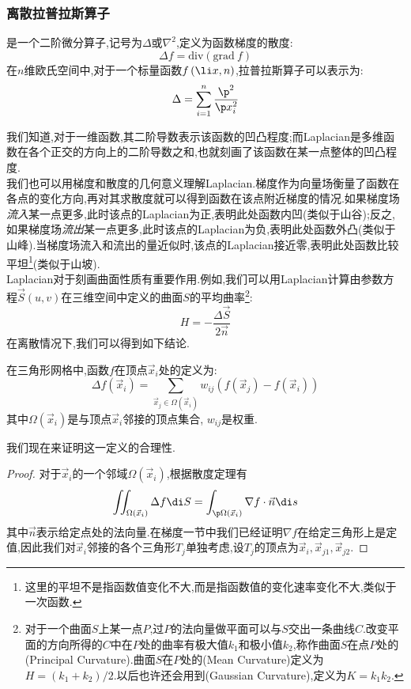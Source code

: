 \documentclass{ctexart}
\begin{document}
\subsubsection{离散拉普拉斯算子}
\begin{definition}[拉普拉斯算子]
    是一个二阶微分算子,记号为$\Delta$或$\nabla^2$,定义为函数梯度的散度:
    \[\Delta f=\text{div}\left(\text{grad}\ f\right)\]
    在$n$维欧氏空间中,对于一个标量函数$f\left(\li x,n\right)$,拉普拉斯算子可以表示为:
    \[\Delta=\sum_{i=1}^{n}\dfrac{\p^2}{\p x_i^2}\]
\end{definition}
我们知道,对于一维函数,其二阶导数表示该函数的凹凸程度;而Laplacian是多维函数在各个正交的方向上的二阶导数之和,也就刻画了该函数在某一点整体的凹凸程度.\\
\indent 我们也可以用梯度和散度的几何意义理解Laplacian.梯度作为向量场衡量了函数在各点的变化方向,再对其求散度就可以得到函数在该点附近梯度的情况.如果梯度场\textit{流入}某一点更多,此时该点的Laplacian为正,表明此处函数内凹(类似于山谷);反之,如果梯度场\textit{流出}某一点更多,此时该点的Laplacian为负,表明此处函数外凸(类似于山峰).当梯度场流入和流出的量近似时,该点的Laplacian接近零,表明此处函数比较平坦\footnote{这里的平坦不是指函数值变化不大,而是指函数值的变化速率变化不大,类似于一次函数.}(类似于山坡).\\
\indent Laplacian对于刻画曲面性质有重要作用.例如,我们可以用Laplacian计算由参数方程$\vec{S}(u,v)$在三维空间中定义的曲面$S$的平均曲率\footnote{对于一个曲面$S$上某一点$P$,过$P$的法向量做平面可以与$S$交出一条曲线$C$.改变平面的方向所得的$C$中在$P$处的曲率有极大值$k_1$和极小值$k_2$,称作曲面$S$在点$P$处的(Principal Curvature).曲面$S$在$P$处的(Mean Curvature)定义为$H=\left(k_1+k_2\right)/2$.以后也许还会用到(Gaussian Curvature),定义为$K=k_1k_2$.}:
\[H=-\dfrac{\Delta\vec{S}}{2\vec{n}}\]
\indent 在离散情况下,我们可以得到如下结论.
\begin{definition}[离散拉普拉斯算子]
    在三角形网格中,函数$f$在顶点$\vec{x}_i$处的定义为:
    \[\Delta f\left(\vec{x}_i\right)=\sum_{\vec{x}_j\in\Omega(\vec{x}_i)}w_{ij}\left(f\left(\vec{x}_j\right)-f\left(\vec{x}_i\right)\right)\]
    其中$\Omega(\vec{x}_i)$是与顶点$\vec{x}_i$邻接的顶点集合, $w_{ij}$是权重.
\end{definition}
我们现在来证明这一定义的合理性.
\begin{proof}
    对于$\vec{x}_i$的一个邻域$\Omega(\vec{x}_i)$,根据散度定理有
    \[\iint_{\Omega(\vec{x}_i)}\Delta f\di S=\int_{\p\Omega(\vec{x}_i)}\nabla f\cdot\vec{n}\di s\]
    其中$\vec{n}$表示给定点处的法向量.在梯度一节中我们已经证明$\nabla f$在给定三角形上是定值,因此我们对$\vec{x}_i$邻接的各个三角形$T_j$单独考虑,设$T_j$的顶点为$\vec{x}_i,\vec{x}_{j1},\vec{x}_{j2}$.
\end{proof}
\end{document}
